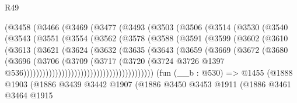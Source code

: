 \begin{lexlean}{R49}
\begin{coremodule}
              (@3458
                (@3466
                  (@3469
                    (@3477
                      (@3493
                        (@3503
                          (@3506
                            (@3514
                              (@3530
                                (@3540
                                  (@3543
                                    (@3551
                                      (@3554
                                        (@3562
                                          (@3578
                                            (@3588
                                              (@3591
                                                (@3599
                                                  (@3602
                                                    (@3610
                                                      (@3613
                                                        (@3621
                                                          (@3624
                                                            (@3632
                                                              (@3635
                                                                (@3643
                                                                  (@3659
                                                                    (@3669
                                                                      (@3672
                                                                        (@3680
                                                                          (@3696
                                                                            (@3706
                                                                              (@3709
                                                                                (@3717
                                                                                  (@3720
                                                                                    (@3724
                                                                                      @3726
                                                                                      @1397
                                                                                      @536)))))))))))))))))))))))))))))))))))))))))
    (fun (__b : @530) =>
    @1455
      (@1888
        @1903
        (@1886
          @3439
          @3442
          @1907
          (@1886
            @3450
            @3453
            @1911
            (@1886
              @3461
              @3464
              @1915

\end{coremodule}
\end{lexlean}
